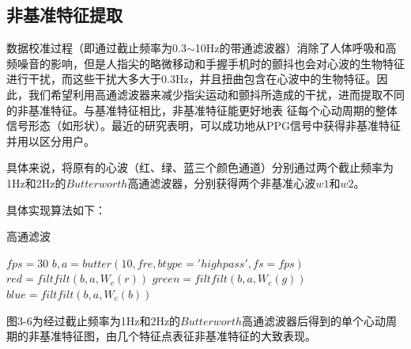 \subsection{非基准特征提取}
{数据校准过程（即通过截止频率为0.3$\sim$10Hz的带通滤波器）消除了人体呼吸和高频噪音的影响，但是人指尖的略微移动和手握手机时的颤抖也会对心波的生物特征进行干扰，而这些干扰大多大于0.3Hz，并且扭曲包含在心波中的生物特征。因此，我们希望利用高通滤波器来减少指尖运动和颤抖所造成的干扰，进而提取不同的非基准特征。与基准特征相比，非基准特征能更好地表 征每个心动周期的整体信号形态（如形状）。最近的研究\cite{2017Non}表明，可以成功地从PPG信号中获得非基准特征并用以区分用户。}
\par
{具体来说，将原有的心波（红、绿、蓝三个颜色通道）分别通过两个截止频率为1Hz和2Hz的$Butterworth$高通滤波器\cite{1975Theory}，分别获得两个非基准心波$w1$和$w2$。}
\par
{具体实现算法如下：}
\begin{algorithm}
        \caption{高通滤波}
        \begin{algorithmic}[1] %
        \State $fps=30$ \hspace{12em}{\#设置采用频率}
        \hspace{6em}\space{}
            \State $b, a = butter(10, fre, btype='highpass', fs=fps)$
            \State $red = filtfilt(b, a, W_c(r))$\hspace{3em}\space{}
            \State $green = filtfilt(b, a, W_c(g))$
            \State $blue = filtfilt(b, a, W_c(b))$
        \EndFunction
        \end{algorithmic}
    \end{algorithm}
\par
{图3-6为经过截止频率为1Hz和2Hz的$Butterworth$高通滤波器后得到的单个心动周期的非基准特征图，由几个特征点表征非基准特征的大致表现。}
